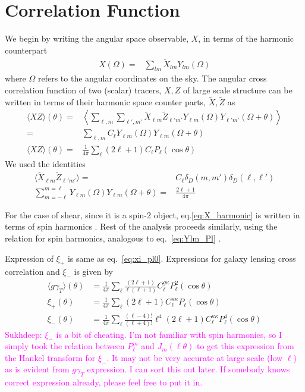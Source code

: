 \documentclass[]{article}
\newcommand{\sukhdeep}[1]{{\textcolor{magenta}{Sukhdeep: #1}}}
\begin{document}
\section{Correlation Function}
	We begin by writing the angular space observable, $X$, in terms of the harmonic counterpart 
	\begin{align}\label{eq:X_harmonic}
		X(\Omega)=&\sum_{lm}\tilde X_{lm}Y_{lm}(\Omega)
	\end{align}
	where $\Omega$ refers to the angular coordinates on the sky.
	The angular cross correlation function of two (scalar) tracers, $X,Z$ of large scale structure can be written in terms 
	of their harmonic space counter parts, $\tilde X, \tilde Z$ as
	\begin{align}
		\langle XZ \rangle(\theta)=&\left\langle\sum_{\ell,m}\sum_{\ell', m'}\tilde X_{\ell m}\tilde Z_{\ell' m'}
									Y_{\ell m}(\Omega)
									Y_{\ell'm'}(\Omega+\theta)\right\rangle\\
									=&\sum_{\ell,m}C_{\ell}Y_{\ell m}(\Omega)
									Y_{\ell m}(\Omega+\theta)\\
		\langle XZ \rangle(\theta)=&\frac{1}{4\pi}\sum_{\ell}(2\ell+1)C_{\ell}P_{\ell}(\cos\theta)\label{eq:xi_pl0}
	\end{align}
	We used the identities
	\begin{align}
		\langle\tilde X_{\ell m}\tilde Z_{\ell' m'}\rangle=&C_{\ell}\delta_D(m,m')\delta_D(\ell,\ell')\\
		\sum_{m=-\ell}^{m=\ell}Y_{\ell m}(\Omega)Y_{\ell m}(\Omega+\theta)=&\frac{2\ell+1}{4\pi}\label{eq:Ylm_Pl}
	\end{align}
	
	For the case of shear, since it is a spin-2 object, eq.\ref{eq:X_harmonic} is written in terms of spin harmonics 
	\citep[see for ex.][]{Castro2005,Kilbinger2017}. Rest of the analysis proceeds similarly, using the relation for spin harmonics, 
	analogous to eq.~\ref{eq:Ylm_Pl} \cite{Hu1997}. 
	
	Expression of $\xi_+$ is same as eq.~\ref{eq:xi_pl0}. Expressions for galaxy lensing cross correlation 
	\cite{Putter2010} and $\xi_-$ is given by
	\begin{align}
		\langle g\gamma_T\rangle(\theta)&=\frac{1}{4\pi}\sum_{\ell}\frac{(2\ell+1)}{\ell(\ell+1)}C_{\ell}^{g\kappa}
		P_{\ell}^2(\cos\theta)\label{eq:xi_g_gamma}\\
		\xi_+(\theta)&=\frac{1}{4\pi}\sum_{\ell}{(2\ell+1)}C_{\ell}^{\kappa\kappa}
		P_{\ell}(\cos\theta)\label{eq:xi_p}\\
		\xi_-(\theta)&=\frac{1}{4\pi}\sum_{\ell}\frac{(\ell-4)!}{(\ell+4)!}\ell^4{(2\ell+1)}C_{\ell}^{\kappa\kappa}
		P_{\ell}^4(\cos\theta)\label{eq:xi_m}
	\end{align}
\sukhdeep{$\xi_-$ is a bit of cheating. I'm not familiar with spin harmonics, so I simply took the relation between 
$P_\ell^m$ and $J_m(\ell \theta)$ to get this expression from the Hankel transform for $\xi_-$. It may not be very accurate at large scale (low $\ell$) as is evident from $g\gamma_T$ expression. I can sort this out later. If somebody knows correct expression already, please feel free to put it in.}
\end{document}

